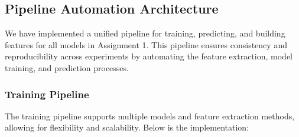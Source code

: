\subsection{Pipeline Automation Architecture}

We have implemented a unified pipeline for training, predicting, and building features for all models in Assignment 1. This pipeline ensures consistency and reproducibility across experiments by automating the feature extraction, model training, and prediction processes.

\subsubsection{Training Pipeline}
The training pipeline supports multiple models and feature extraction methods, allowing for flexibility and scalability. Below is the implementation:

